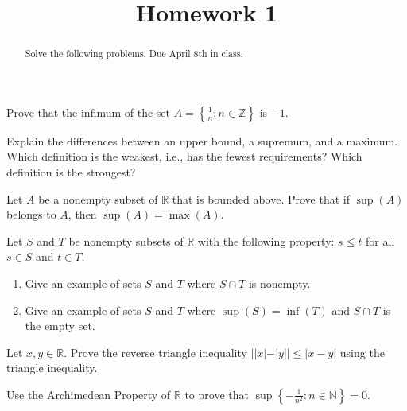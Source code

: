 \documentclass{ximera}
\begin{document}
    \title{Homework 1}
    \begin{abstract} Solve the following problems.  Due April 8th in class. \end{abstract}
    \maketitle

    \begin{exercise}
            Prove that the infimum of the set $A = \left\{\frac{1}{n} : n \in \mathbb{Z}\right\}$ is $-1$.
    \end{exercise}    

    \begin{exercise}
        Explain the differences between an upper bound, a supremum, and a maximum.  Which definition is the weakest, i.e., has the fewest requirements?  Which definition is the strongest?
    \end{exercise}

    \begin{exercise}
        Let $A$ be a nonempty subset of $\mathbb{R}$ that is bounded above.  Prove that if $\sup(A)$ belongs to $A$, then $\sup(A) = \max(A)$.
    \end{exercise}

    \begin{exercise}
        Let $S$ and $T$ be nonempty subsets of $\mathbb{R}$ with the following property: $s \leq t$ for all $s \in S$ and $t \in T$.
        \begin{enumerate}
            \item Give an example of sets $S$ and $T$ where $S \cap T$ is nonempty.
            \item Give an example of sets $S$ and $T$ where $\sup(S) = \inf(T)$ and $S \cap T$ is the empty set.
        \end{enumerate}
    \end{exercise}

    \begin{exercise}
        Let $x, y \in \mathbb{R}$.  Prove the reverse triangle inequality $||x|- |y|| \leq |x-y|$ using the triangle inequality. 
    \end{exercise}

    \begin{exercise}
        Use the Archimedean Property of $\mathbb{R}$ to prove that $\sup\left\{-\frac{1}{n^2} : n \in \mathbb{N}\right\} = 0$.
    \end{exercise}
\end{document}
